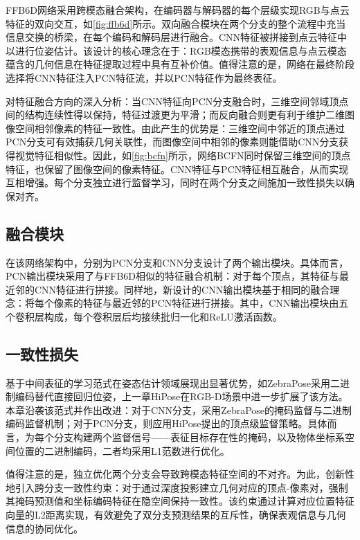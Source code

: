 FFB6D网络采用跨模态融合架构，在编码器与解码器的每个层级实现RGB与点云特征的双向交互，如\autoref{fig:ffb6d}所示。双向融合模块在两个分支的整个流程中充当信息交换的桥梁，在每个编码和解码层进行融合。CNN特征被拼接到点云特征中以进行位姿估计。该设计的核心理念在于：RGB模态携带的表观信息与点云模态蕴含的几何信息在特征提取过程中具有互补价值。值得注意的是，网络在最终阶段选择将CNN特征注入PCN特征流，并以PCN特征作为最终表征。

对特征融合方向的深入分析：当CNN特征向PCN分支融合时，三维空间邻域顶点间的结构连续性得以保持，特征过渡更为平滑；而反向融合则更有利于维护二维图像空间相邻像素的特征一致性。由此产生的优势是：三维空间中邻近的顶点通过PCN分支可有效捕获几何关联性，而图像空间中相邻的像素则能借助CNN分支获得视觉特征相似性。因此，如\autoref{fig:bcfn}所示，网络BCFN同时保留三维空间的顶点特征，也保留了图像空间的像素特征。CNN特征与PCN特征相互融合，从而实现互相增强。每个分支独立进行监督学习，同时在两个分支之间施加一致性损失以确保对齐。

\subsection{融合模块}

\par 在该网络架构中，分别为PCN分支和CNN分支设计了两个输出模块。具体而言，PCN输出模块采用了与FFB6D相似的特征融合机制：对于每个顶点，其特征与最近邻的CNN特征进行拼接。同样地，新设计的CNN输出模块基于相同的融合理念：将每个像素的特征与最近邻的PCN特征进行拼接。其中，CNN输出模块由五个卷积层构成，每个卷积层后均接续批归一化和ReLU激活函数。

\subsection{一致性损失}

\par 基于中间表征的学习范式在姿态估计领域展现出显著优势，如ZebraPose\cite{su2022zebrapose}采用二进制编码替代直接回归位姿，上一章HiPose在RGB-D场景中进一步扩展了该方法。本章沿袭该范式并作出改进：对于CNN分支，采用ZebraPose的掩码监督与二进制编码监督机制；对于PCN分支，则应用HiPose提出的顶点级监督策略。具体而言，为每个分支构建两个监督信号——表征目标存在性的掩码，以及物体坐标系空间位置的二进制编码，二者均采用L1范数进行优化。

\par 值得注意的是，独立优化两个分支会导致跨模态特征空间的不对齐。为此，创新性地引入跨分支一致性约束：对于通过深度投影建立几何对应的顶点-像素对，强制其掩码预测值和坐标编码特征在隐空间保持一致性。该约束通过计算对应位置特征向量的L2距离实现，有效避免了双分支预测结果的互斥性，确保表观信息与几何信息的协同优化。

